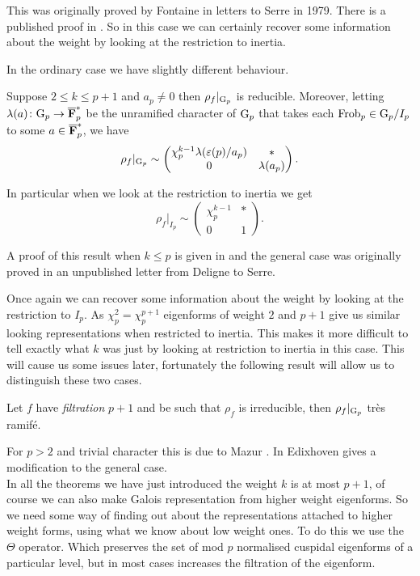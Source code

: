 \documentclass[a4paper,12pt]{article}
\begin{document}
This was originally proved by Fontaine in letters to Serre in 1979.
There is a published proof in \cite[sec. 6]{EdixhovenWeight}.
So in this case we can certainly recover some information about the weight by looking at the restriction to inertia.

In the ordinary case we have slightly different behaviour.

\begin{thm}[Deligne]\label{thm:ordinary}
Suppose $2\le k\le p+1$ and $a_p \ne 0$ then $\rho_{f}|_{\mathrm{G}_p}$ is reducible.
Moreover, letting $\lambda(a)\colon \mathrm{G}_p \to \overline{\mathbf{F}}_p^*$ be the unramified character of $\mathrm{G}_p$ that takes each $\operatorname{Frob}_p \in \mathrm{G}_p /I_p$ to some $a\in\overline{\mathbf{F}}_p^*$, we have
\[
\rho_{f}|_{\mathrm{G}_p} \sim \begin{pmatrix} \chi_p^{k-1}\lambda(\varepsilon(p)/a_p) & * \\ 0 & \lambda(a_p)\end{pmatrix}.
\]

In particular when we look at the restriction to inertia we get
\[
\rho_{f}|_{I_{p}} \sim \begin{pmatrix} \chi_p^{k-1} & * \\ 0 & 1\end{pmatrix}.
\]
\end{thm}

A proof of this result when $k \le p$ is given in \cite{Gross} and the general case was originally proved in an unpublished letter from Deligne to Serre.

Once again we can recover some information about the weight by looking at the restriction to $I_p$.
As $\chi_p^{2} = \chi_p^{p+1}$ eigenforms of weight $2$ and $p+1$ give us similar looking representations when restricted to inertia.
This makes it more difficult to tell exactly what $k$ was just by looking at restriction to inertia in this case.
This will cause us some issues later, fortunately the following result will allow us to distinguish these two cases.

\begin{thm}[Mazur]\label{thm:mazur}
Let $f$ have \emph{filtration} $p+1$ and be such that $\rho_{f}$ is irreducible, then $\rho_{f}|_{\mathrm{G}_p}$ tr\`es ramif\'e.
\end{thm}

For $p> 2$ and trivial character this is due to Mazur \cite[sec. 6]{Ribet90}.
In \cite[sec. 2]{EdixhovenWeight} Edixhoven gives a modification to the general case.
\\[12pt] \noindent
In all the theorems we have just introduced the weight $k$ is at most $p+1$, of course we can also make Galois representation from higher weight eigenforms.
So we need some way of finding out about the representations attached to higher weight forms, using what we know about low weight ones.
To do this we use the $\Theta$ operator.
Which preserves the set of mod $p$ normalised cuspidal eigenforms of a particular level, but in most cases  increases the filtration of the eigenform.
\end{document}
